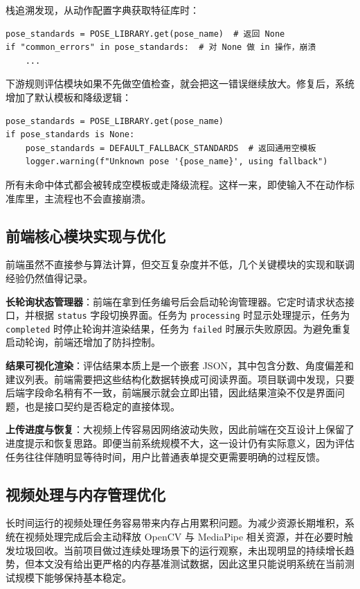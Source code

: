 栈追溯发现，从动作配置字典获取特征库时：
\begin{verbatim}
pose_standards = POSE_LIBRARY.get(pose_name)  # 返回 None
if "common_errors" in pose_standards:  # 对 None 做 in 操作，崩溃
    ...
\end{verbatim}
下游规则评估模块如果不先做空值检查，就会把这一错误继续放大。修复后，系统增加了默认模板和降级逻辑：
\begin{verbatim}
pose_standards = POSE_LIBRARY.get(pose_name)
if pose_standards is None:
    pose_standards = DEFAULT_FALLBACK_STANDARDS  # 返回通用空模板
    logger.warning(f"Unknown pose '{pose_name}', using fallback")
\end{verbatim}
所有未命中体式都会被转成空模板或走降级流程。这样一来，即使输入不在动作标准库里，主流程也不会直接崩溃。

\subsection{前端核心模块实现与优化}
前端虽然不直接参与算法计算，但交互复杂度并不低，几个关键模块的实现和联调经验仍然值得记录。

\textbf{长轮询状态管理器}：前端在拿到任务编号后会启动轮询管理器。它定时请求状态接口，并根据 \texttt{status} 字段切换界面。任务为 \texttt{processing} 时显示处理提示，任务为 \texttt{completed} 时停止轮询并渲染结果，任务为 \texttt{failed} 时展示失败原因。为避免重复启动轮询，前端还增加了防抖控制。

\textbf{结果可视化渲染}：评估结果本质上是一个嵌套 JSON，其中包含分数、角度偏差和建议列表。前端需要把这些结构化数据转换成可阅读界面。项目联调中发现，只要后端字段命名稍有不一致，前端展示就会立即出错，因此结果渲染不仅是界面问题，也是接口契约是否稳定的直接体现。

\textbf{上传进度与恢复}：大视频上传容易因网络波动失败，因此前端在交互设计上保留了进度提示和恢复思路。即便当前系统规模不大，这一设计仍有实际意义，因为评估任务往往伴随明显等待时间，用户比普通表单提交更需要明确的过程反馈。

\subsection{视频处理与内存管理优化}
长时间运行的视频处理任务容易带来内存占用累积问题。为减少资源长期堆积，系统在视频处理完成后会主动释放 OpenCV 与 MediaPipe 相关资源，并在必要时触发垃圾回收。当前项目做过连续处理场景下的运行观察，未出现明显的持续增长趋势，但本文没有给出更严格的内存基准测试数据，因此这里只能说明系统在当前测试规模下能够保持基本稳定。

